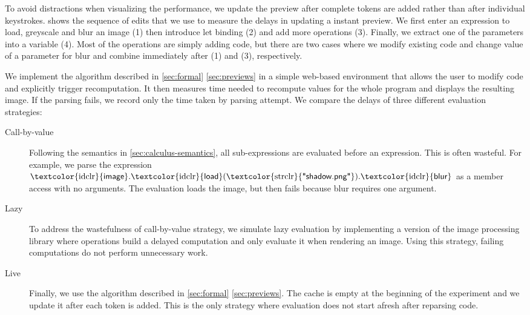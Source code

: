\documentclass[english,crc,references=cleveref]{programming}
\theoremstyle{plain}
\theoremstyle{definition}
\newcommand{\str}[1]{\textnormal{\textcolor{strclr}{\sffamily "#1"}}}
\newcommand{\ident}[1]{\textnormal{\textcolor{idclr}{\sffamily #1}}}
\begin{document}

To avoid distractions when visualizing the performance, we update the preview after complete tokens are
added rather than after individual keystrokes.
 shows the sequence of edits that we use to measure
the delays in updating a instant preview. We first enter an expression to load, greyscale and blur
an image (1) then introduce let binding (2) and add more operations (3). Finally, we extract
one of the parameters into a variable (4). Most of the operations are simply adding code, but
there are two cases where we modify existing code and change value of a parameter for \ident{blur}
and \ident{combine} immediately after (1) and (3), respectively.

We implement the algorithm described in \cref{sec:formal} \cref{sec:previews} in a
simple web-based environment that allows the user to modify code and explicitly trigger
recomputation. It then measures time needed to recompute values for the whole program and
displays the resulting image. If the parsing fails, we record only the time taken by parsing attempt. We compare the
delays of three different evaluation strategies:

\begin{description}
\item[Call-by-value] Following the semantics in \cref{sec:calculus-semantics},
  all sub-expressions are evaluated before an expression. This is often wasteful. For example,
  we parse the expression $\ident{image}.\ident{load}(\str{shadow.png}).\ident{blur}$ as a member access with no
  arguments. The evaluation loads the image, but then fails because blur requires one argument.

\item[Lazy] To address the wastefulness of call-by-value strategy, we
  simulate lazy evaluation by implementing a version of the image processing library where
  operations build a delayed computation and only evaluate it when rendering an image. Using
  this strategy, failing computations do not perform unnecessary work.

\item[Live] Finally, we use the algorithm described in
  \cref{sec:formal} \cref{sec:previews}. The cache is empty at the beginning of the
  experiment and we update it after each token is added. This is the only strategy where
  evaluation does not start afresh after reparsing code.
\end{description}
\end{document}
